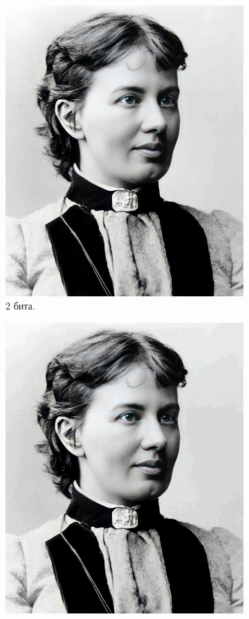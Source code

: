 \documentclass[11pt,a4paper,final]{article} %
\begin{document}
\begin{figure}[h!]
\begin{subfigure}[b]{0.3\linewidth}
		\includegraphics[width=\linewidth]{img/sofya-2-5.png}
		\caption{2 бита.}
		\label{fig:p2}
	\end{subfigure}
	\hfill
	\begin{subfigure}[b]{0.3\linewidth}
		\centering
		\includegraphics[width=\linewidth]{img/sofya-3-5.png}

\end{subfigure}
\end{figure}
\end{document}
